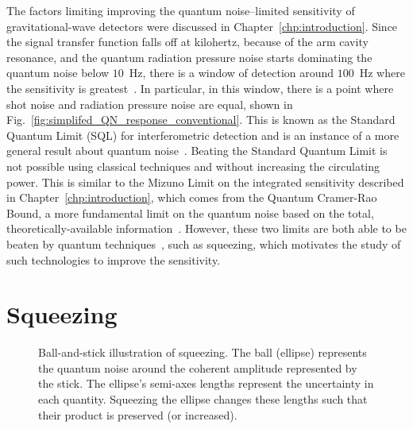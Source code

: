 The factors limiting improving the quantum noise--limited sensitivity of gravitational-wave detectors were discussed in Chapter~\ref{chp:introduction}. Since the signal transfer function falls off at kilohertz, because of the arm cavity resonance, and the quantum radiation pressure noise starts dominating the quantum noise below $10$~Hz, there is a window of detection around $100$~Hz where the sensitivity is greatest~\cite{}. In particular, in this window, there is a point where shot noise and radiation pressure noise are equal, shown in Fig.~\ref{fig:simplifed_QN_response_conventional}.  %
This is known as the Standard Quantum Limit (SQL) for interferometric detection and is an instance of a more general result about quantum noise~\cite{}. Beating the Standard Quantum Limit is not possible using classical techniques  and without increasing the circulating power. This is similar to the Mizuno Limit on the integrated sensitivity described in Chapter~\ref{chp:introduction}, which comes from the Quantum Cramer-Rao Bound, a more fundamental limit on the quantum noise based on the total, theoretically-available information~\cite{MiaoQCRB2015}. However, these two limits are both able to be beaten  by quantum techniques~\cite{MiaoQCRB2015,}, such as squeezing, which motivates the study of such technologies to improve the sensitivity.



\section{Squeezing}
\label{sec:squeezing_background}

\begin{figure}
	\centering
	\caption{Ball-and-stick illustration of squeezing. The ball (ellipse) represents the quantum noise around the coherent amplitude represented by the stick. The ellipse's semi-axes lengths represent the uncertainty in each quantity. Squeezing the ellipse changes these lengths such that their product is preserved (or increased).}
	\label{fig:ballandstick_simple}
\end{figure}

